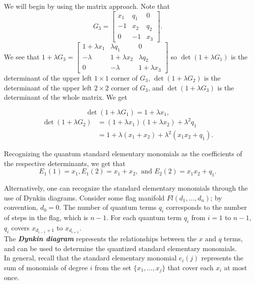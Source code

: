 \documentclass[11pt]{article}
\begin{document}
\begin{eg}

We will begin by using the matrix approach. Note that
\[
    G_3 = \begin{bmatrix}
    x_1 & q_1 & 0 \\
    -1 & x_2 & q_2 \\
    0 & -1 & x_3
    \end{bmatrix}.
\]
We see that $1 + \lambda G_3 = \begin{bmatrix}
    1 + \lambda x_1 & \lambda q_1 & 0 \\
    -\lambda & 1 + \lambda x_2 & \lambda q_2 \\
    0 & -\lambda & 1 + \lambda x_3
    \end{bmatrix}$
so $\det (1 + \lambda G_1)$ is the determinant of the upper left $1 \times 1$ corner of $G_3$, $\det (1 + \lambda G_2)$  is the determinant of the upper left $2 \times 2$ corner of $G_3$, and $\det (1 + \lambda G_3)$ is the determinant of the whole matrix. We get

\[
    \det (1 + \lambda G_1) = 1 + \lambda x_1,
\]
\begin{align*}
    \det (1 + \lambda G_2) &= (1+\lambda x_1)(1+\lambda x_2) + \lambda^2 q_1 \\
    &= 1 + \lambda (x_1 + x_2) + \lambda^2 (x_1x_2 + q_1).
\end{align*}

Recognizing the quantum standard elementary monomials as the coefficients of the respective determinants, we get that
\[
    \boxed{E_1(1) = x_1, E_1(2) = x_1 + x_2, \text{ and } E_2(2) = x_1x_2 + q_1}.
\]
\end{eg}

\vspace{0.5cm}
Alternatively, one can recognize the standard elementary monomials through the use of Dynkin diagrams. Consider some flag manifold $Fl(d_1, \dots, d_n)$; by convention, $d_0 = 0$. The number of quantum terms $q_i$ corresponds to the number of steps in the flag, which is $n-1$. For each quantum term $q_i$ from $i = 1$ to $n-1$, $q_i$ covers $x_{d_{i-1} + 1}$ to $x_{d_{i+1}}$. \\

The \textit{\textbf{Dynkin diagram}} represents the relationships between the $x$ and $q$ terms, and can be used to determine the quantized standard elementary monomials. \\

In general, recall that the standard elementary monomial $e_i(j)$ represents the sum of monomials of degree $i$ from the set $\{x_1, \dots, x_j\}$ that cover each $x_i$ at most once. \\
\end{document}
